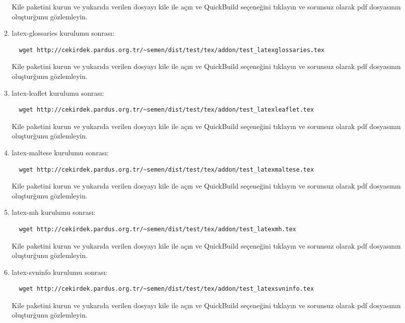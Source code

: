 \documentclass[a4paper,10pt]{article}
\begin{document}
\begin{enumerate}
Kile paketini kurun ve yukarıda verilen dosyayı kile ile açın ve QuickBuild  seçeneğini tıklayın ve sorunsuz olarak pdf dosyasının oluşturğunu gözlemleyin.
\item  latex-glossaries kurulumu sonrası:
\begin{verbatim}
  wget http://cekirdek.pardus.org.tr/~semen/dist/test/tex/addon/test_latexglossaries.tex
\end{verbatim}

Kile paketini kurun ve yukarıda verilen dosyayı kile ile açın ve QuickBuild  seçeneğini tıklayın ve sorunsuz olarak pdf dosyasının oluşturğunu gözlemleyin.
\item  latex-leaflet kurulumu sonrası:
\begin{verbatim}
  wget http://cekirdek.pardus.org.tr/~semen/dist/test/tex/addon/test_latexleaflet.tex
\end{verbatim}

Kile paketini kurun ve yukarıda verilen dosyayı kile ile açın ve QuickBuild  seçeneğini tıklayın ve sorunsuz olarak pdf dosyasının oluşturğunu gözlemleyin.
\item  latex-maltese kurulumu sonrası:
\begin{verbatim}
  wget http://cekirdek.pardus.org.tr/~semen/dist/test/tex/addon/test_latexmaltese.tex
\end{verbatim}

Kile paketini kurun ve yukarıda verilen dosyayı kile ile açın ve QuickBuild  seçeneğini tıklayın ve sorunsuz olarak pdf dosyasının oluşturğunu gözlemleyin.

\item  latex-mh kurulumu sonrası:
\begin{verbatim}
  wget http://cekirdek.pardus.org.tr/~semen/dist/test/tex/addon/test_latexmh.tex
\end{verbatim}

Kile paketini kurun ve yukarıda verilen dosyayı kile ile açın ve QuickBuild  seçeneğini tıklayın ve sorunsuz olarak pdf dosyasının oluşturğunu gözlemleyin.
\item  latex-svninfo kurulumu sonrası:
\begin{verbatim}
  wget http://cekirdek.pardus.org.tr/~semen/dist/test/tex/addon/test_latexsvninfo.tex
\end{verbatim}

Kile paketini kurun ve yukarıda verilen dosyayı kile ile açın ve QuickBuild  seçeneğini tıklayın ve sorunsuz olarak pdf dosyasının oluşturğunu gözlemleyin.


\end{enumerate}
\end{document}
